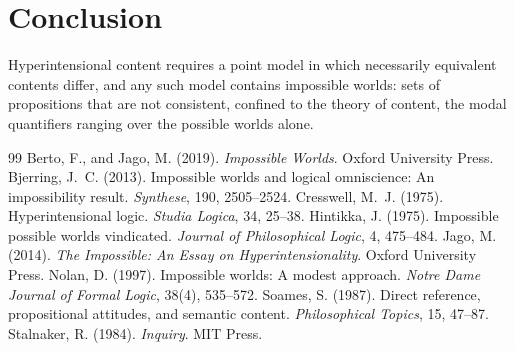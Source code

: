 \documentclass{situationist-preprint}
\begin{document}
\section{Conclusion}

Hyperintensional content requires a point model in which necessarily equivalent contents differ, and any such model contains impossible worlds: sets of propositions that are not consistent, confined to the theory of content, the modal quantifiers ranging over the possible worlds alone.

\begin{thebibliography}{99}\small
{} Berto, F., and Jago, M. (2019). \emph{Impossible Worlds}. Oxford University Press.
 Bjerring, J.~C. (2013). Impossible worlds and logical omniscience: An impossibility result. \emph{Synthese}, 190, 2505--2524.
 Cresswell, M.~J. (1975). Hyperintensional logic. \emph{Studia Logica}, 34, 25--38.
 Hintikka, J. (1975). Impossible possible worlds vindicated. \emph{Journal of Philosophical Logic}, 4, 475--484.
 Jago, M. (2014). \emph{The Impossible: An Essay on Hyperintensionality}. Oxford University Press.
 Nolan, D. (1997). Impossible worlds: A modest approach. \emph{Notre Dame Journal of Formal Logic}, 38(4), 535--572.
 Soames, S. (1987). Direct reference, propositional attitudes, and semantic content. \emph{Philosophical Topics}, 15, 47--87.
 Stalnaker, R. (1984). \emph{Inquiry}. MIT Press.
\end{thebibliography}
\end{document}

